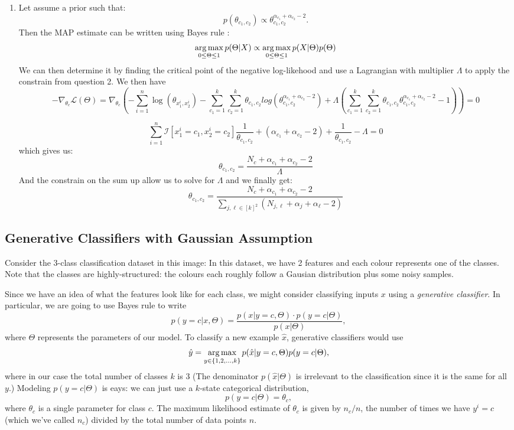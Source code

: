 \documentclass{article}
\begin{document}
\begin{enumerate}
\item Let assume a prior such that:
 \[
 p(\theta_{c_1,c_2}) \propto \theta_{c_1,c_2}^{\alpha_{c_1} + \alpha_{c_2} - 2}.
 \]
 Then the MAP estimate can be written using Bayes rule :
 \[
 \mathop{\rm arg\,max}_{0 \leq \Theta \leq 1} p(\Theta|X) \propto  \mathop{\rm arg\,max}_{0 \leq \Theta \leq 1} p(X|\Theta) p(\Theta)
 \]
 We can then determine it by finding the critical point of the negative log-likehood and use a Lagrangian with multiplier $\Lambda$ to apply the constrain from question 2. We then have
 \[
 - \nabla_{\theta_{c}} \mathcal{L}(\Theta)  = \nabla_{\theta_{c}} \left(-\sum_{i=1}^n \log(\theta_{x_1^i,x_2^i}) - \sum_{c_1=1}^k\sum_{c_2=1}^k \theta_{c_1,c_2} log(\theta_{c_1,c_2}^{\alpha_{c_1} + \alpha_{c_2}- 2}) + \Lambda (\sum_{c_1=1}^k\sum_{c_2=1}^k \theta_{c_1,c_2} \theta_{c_1,c_2}^{\alpha_{c_1} + \alpha_{c_2} - 2} -1)\right) = 0
 \]

 \[
 \sum_{i=1}^n \mathcal{I}[x^i_1 = c_1,x^i_2 = c_2] \frac{1}{\theta_{c_1,c_2}}+(\alpha_{c_1} + \alpha_{c_2}- 2)+\frac{1}{\theta_{c_1,c_2}} - \Lambda = 0
 \]
 which gives us:
 \[
 \theta_{c_1,c_2} = \frac{N_c+\alpha_{c_1} +\alpha_{c_2}- 2}{\Lambda}
 \]
 And the constrain on the sum up allow us to solve for $\Lambda$ and we finally get:
  \[ 
  \theta_{c_1,c_2} = \frac{N_c+\alpha_{c_1} +\alpha_{c_2}- 2}{\sum_{j,\ell \in [k]^2} (N_{j,\ell}+\alpha_j+\alpha_{\ell}-2)}
 \]

\end{enumerate}

\subsection{Generative Classifiers with Gaussian Assumption}

Consider the 3-class classification dataset in this image:
In this dataset, we have 2 features and each colour represents one of the classes. Note that the classes are highly-structured: the colours each roughly follow a Gausian distribution plus some noisy samples.

Since we have an idea of what the features look like for each class, we might consider classifying  inputs $x$ using a \emph{generative classifier}. In particular, we are going to use Bayes rule to write
\[
p(y=c|x,\Theta) = \frac{p(x| y=c, \Theta) \cdot p(y=c|\Theta)}{p(x|\Theta)},
\]
where $\Theta$ represents the parameters of our model. To classify a new example $\hat{x}$, generative classifiers would use
\[
\hat{y} = \mathop{\rm arg\,max}_{y \in \{1,2,\dots,k\}} p(\hat{x}| y=c,\Theta)p(y=c|\Theta),
\]
where in our case the total number of classes $k$ is $3$ (The denominator $p(\hat{x}|\Theta)$ is irrelevant to the classification since it is the same for all $y$.)
Modeling $p(y=c|\Theta)$ is eays: we can just use a $k$-state categorical distribution,
\[
p(y = c | \Theta) = \theta_c,
\]
where $\theta_c$ is a single parameter for class $c$. The maximum likelihood estimate of $\theta_c$ is given by $n_c/n$, the number of times we have $y^i = c$ (which we've called $n_c$) divided by the total number of data points $n$.
\end{document}
